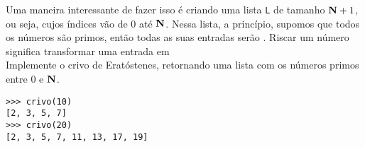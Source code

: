 \documentclass[12pt]{article}
\begin{document}
	Uma maneira interessante de fazer isso é criando uma lista \texttt{L} de tamanho $\mathbf{N} + 1$, ou seja, cujos índices vão de 0 até $\mathbf{N}$. Nessa lista, a princípio, supomos que todos os números são primos, então todas as suas entradas serão . Riscar um número significa transformar uma entrada em \\
	
	\quest Implemente o crivo de Eratóstenes, retornando uma lista com os números primos entre 0 e $\mathbf{N}$.\\
	
	\example
	\begin{lstlisting}
>>> crivo(10)
[2, 3, 5, 7]
>>> crivo(20)
[2, 3, 5, 7, 11, 13, 17, 19]
	\end{lstlisting}
	
	\pagebreak
	

	\pagebreak	
\end{document}
